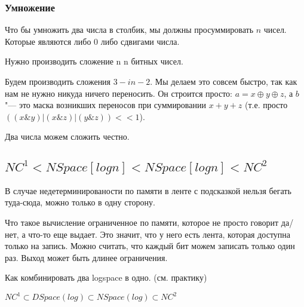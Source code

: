 \subsubsection{Умножение} 
Что бы умножить два числа в столбик, мы должны просуммировать $n$ чисел. 
Которые являются либо 0 либо сдвигами числа. 

Нужно производить сложение n n битных чисел. 

Будем производить сложения $3-in-2$.
Мы делаем это совсем быстро, так как нам не нужно никуда ничего переносить.
Он строится просто: $a = x \oplus y \oplus z$, а $b$ "--- это маска возникших переносов при суммировании $x+y+z$ (т.е. просто $((x \& y) | (x \& z) | (y \& z)) << 1$).

Два числа можем сложить честно.

\subsection{$NC^1 < NSpace[log n] < NSpace[log n] < NC^2$}

\begin{Rem}
	В случае недетерминированости по памяти в ленте с подсказкой нельзя бегать туда-сюда, можно только в одну сторону.
\end{Rem}

\begin{Rem}
	Что такое вычисление ограниченное по памяти, которое не просто говорит да/нет, а что-то еще выдает. Это значит, что у него 
	есть лента, которая доступна только на запись. Можно считать, что каждый бит можем записать только один раз. Выход может быть длинее 
	ограничения. 
\end{Rem}

Как комбинировать два logspace в одно. (см. практику) 

\begin{theorem}
	$NC^1 \subset DSpace(log) \subset NSpace(log) \subset NC^2$\\
\end{theorem}
  
